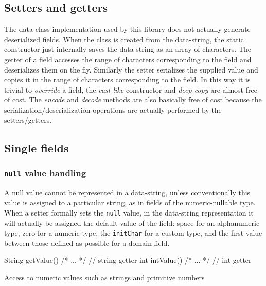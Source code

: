 \subsection{Setters and getters}
The data-class implementation used by this library does not actually generate 
deserialized fields. When the class is created from the data-string, the static 
constructor just internally saves the data-string as an array of characters. 
The getter of a field accesses the range of characters corresponding to the 
field and deserializes them on the fly. 
Similarly the setter serializes the supplied value and copies it in the range of 
characters corresponding to the field. 
In this way it is trivial to \textsl{override} a field, the \textit{cast-like} 
constructor and \textit{deep-copy} are almost free of cost. 
The \textsl{encode} and \textsl{decode} methods are also basically free of cost 
because the serialization/deserialization operations are actually performed by 
the setters/getters.

\subsection{Single fields}
\subsubsection*{\texttt{null} value handling}
A null value cannot be represented in a data-string, unless conventionally this 
value is assigned to a particular string, as in fields of the numeric-nullable 
type. 
When a setter formally sets the \texttt{null} value, in the data-string 
representation it will actually be assigned the default value of the field: 
space for an alphanumeric type, zero for a numeric type, the \texttt{initChar} 
for a custom type, and the first value between those defined as possible for a 
domain field.

\begin{elisting}[!htb]
\begin{javacode}
    String getValue() { /* ... */ }   // string getter
    int intValue() { /* ... */ }      // int getter
\end{javacode}
\caption{Access to numeric values such as strings and primitive numbers}
\label{lst:num.acc.both}
\end{elisting}

